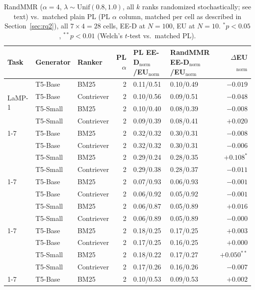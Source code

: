 \documentclass[10pt,twocolumn]{article}
\begin{document}
\begin{table}[t]
\centering
\scriptsize
\caption{RandMMR ($\alpha{=}4$, $\lambda\sim\mathrm{Unif}(0.8,1.0)$, all $k$
ranks randomized stochastically; see text) vs.\ matched plain PL (PL $\alpha$
column, matched per cell as described in Section~\ref{sec:rq2}), all
$7\times4{=}28$ cells, EE-D at $N{=}100$, EU at $N{=}10$. $^{*}p{<}0.05$,
$^{**}p{<}0.01$ (Welch's $t$-test vs.\ matched PL).}
\label{tab:hybrid-full}
\begin{tabular}{@{}lllrllr@{}}
\toprule
Task & Generator & Ranker & PL $\alpha$ & PL EE-D$_{\text{norm}}$/EU$_{\text{norm}}$ & RandMMR EE-D$_{\text{norm}}$/EU$_{\text{norm}}$ & $\Delta$EU$_{\text{norm}}$ \\
\midrule
\multirow{4}{*}{LaMP-1} & T5-Base & BM25 & 2 & 0.11/0.51 & 0.10/0.49 & $-0.019$ \\
 & T5-Base & Contriever & 2 & 0.10/0.56 & 0.09/0.51 & $-0.048$ \\
 & T5-Small & BM25 & 2 & 0.10/0.40 & 0.08/0.39 & $-0.008$ \\
 & T5-Small & Contriever & 2 & 0.09/0.39 & 0.08/0.41 & $+0.020$ \\
\cmidrule(lr){1-7}
\multirow{4}{*}{LaMP-2} & T5-Base & BM25 & 2 & 0.32/0.32 & 0.30/0.31 & $-0.008$ \\
 & T5-Base & Contriever & 2 & 0.32/0.32 & 0.30/0.31 & $-0.006$ \\
 & T5-Small & BM25 & 2 & 0.29/0.24 & 0.28/0.35 & $+0.108^{*}$ \\
 & T5-Small & Contriever & 2 & 0.29/0.38 & 0.28/0.37 & $-0.011$ \\
\cmidrule(lr){1-7}
\multirow{4}{*}{LaMP-3} & T5-Base & BM25 & 2 & 0.07/0.93 & 0.06/0.93 & $-0.001$ \\
 & T5-Base & Contriever & 2 & 0.06/0.92 & 0.05/0.92 & $-0.001$ \\
 & T5-Small & BM25 & 2 & 0.06/0.87 & 0.05/0.89 & $+0.016$ \\
 & T5-Small & Contriever & 2 & 0.06/0.89 & 0.05/0.89 & $-0.000$ \\
\cmidrule(lr){1-7}
\multirow{4}{*}{LaMP-4} & T5-Base & BM25 & 2 & 0.18/0.25 & 0.17/0.25 & $+0.003$ \\
 & T5-Base & Contriever & 2 & 0.17/0.25 & 0.16/0.25 & $+0.000$ \\
 & T5-Small & BM25 & 2 & 0.18/0.22 & 0.17/0.27 & $+0.050^{**}$ \\
 & T5-Small & Contriever & 2 & 0.17/0.26 & 0.16/0.26 & $-0.007$ \\
\cmidrule(lr){1-7}
\multirow{4}{*}{LaMP-5} & T5-Base & BM25 & 2 & 0.10/0.53 & 0.09/0.53 & $+0.002$ \\

\end{tabular}
\end{table}
\end{document}
